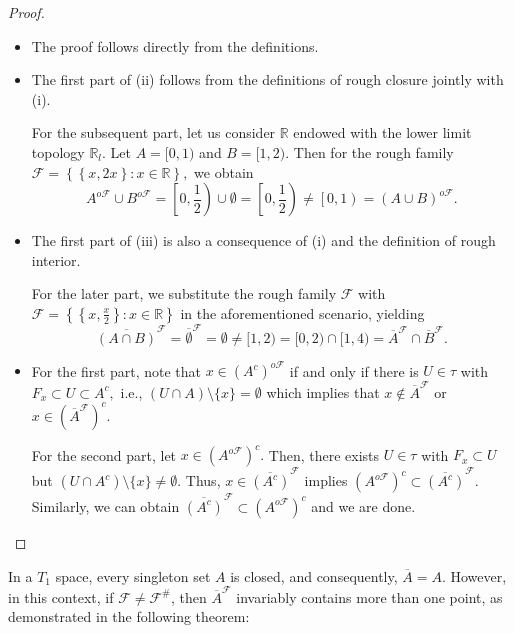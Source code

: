 \documentclass[11pt]{amsart}
\begin{document}
\begin{proof}
 \begin{itemize}
     \item[(i)]The proof follows directly from the definitions.
     
     \item[(ii)] The first part of (ii) follows from the definitions of rough closure jointly with (i). 
     
     For the subsequent part, let us consider $\mathbb{R}$ endowed with the lower limit topology $\mathbb{R}_l.$ Let $A=[0,1)$ and $B=[1,2).$ Then for the rough family $\mathscr{F}=\left\{\left\{x,2x\right\}: x\in \mathbb{R}\right\},$ we obtain $$A^{o\mathscr{F}}\cup B^{o\mathscr{F}}=\left[0,\frac{1}{2}\right)\cup\emptyset=\left[0,\frac{1}{2}\right)\neq \left[0,1\right)=(A\cup B)^{o\mathscr{F}}.$$
     
     \item[(iii)]  The first part of (iii) is also a consequence of (i) and the definition of rough interior.
     
     For the later part, we substitute the rough family $\mathscr{F}$ with $\mathscr{F}=\left\{\left\{x,\frac{x}{2}\right\}: x\in \mathbb{R}\right\}$ in the aforementioned scenario, yielding $$\overline{(A\cap B)}^\mathscr{F}=\overline{\emptyset}^\mathscr{F}=\emptyset\neq [1,2)=[0,2)\cap [1,4)=\overline{A}^\mathscr{F}\cap\overline{B}^\mathscr{F}.$$
     
     \item[(iv)]  For the first part, note that $x\in (A^c)^{o\mathscr{F}}$ if and only if there is $U\in \tau$ with $F_x\subset U\subset A^c,$ i.e., $(U\cap A)\setminus\{x\}=\emptyset$ which implies that $x\notin \overline{A}^\mathscr{F}$ or $x\in \left(\overline{A}^\mathscr{F}\right)^c$.

     For the second part, let $x\in \left(A^{o\mathscr{F}}\right)^c.$ Then, there exists $U\in \tau$ with $F_x\subset U$ but $\left(U\cap A^c\right)\setminus\{x\}\neq \emptyset$. Thus, $x\in \overline{(A^c)}^\mathscr{F}$ implies $\left(A^{o\mathscr{F}}\right)^c\subset \overline{(A^c)}^\mathscr{F}$. Similarly, we can obtain $\overline{(A^c)}^\mathscr{F}\subset \left(A^{o\mathscr{F}}\right)^c$ and we are done.
 \end{itemize}
\end{proof}


In a $T_1$ space, every singleton set $A$ is closed, and consequently, $\overline{A}=A$. However, in this context, if $\mathscr{F} \neq \mathscr{F^\#}$, then $\overline{A}^{\mathscr{F}}$ invariably contains more than one point, as demonstrated in the following theorem:
\end{document}
